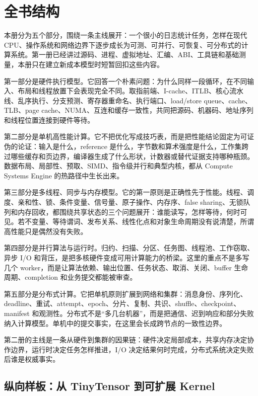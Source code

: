 \chapter*{全书结构}

本册分为五个部分，围绕一条主线展开：一个很小的日志统计任务，怎样在现代 CPU、操作系统和网络边界下逐步成长为可测、可并行、可恢复、可分布式的计算系统。第一册已经讲过源码、进程、虚拟地址、汇编、ABI、工具链和基础测量，本册只在建立新成本模型时短暂回扣这些内容。

第一部分是硬件执行模型。它回答一个朴素问题：为什么同样一段循环，在不同输入、布局和线程放置下会表现完全不同。取指前端、I-cache、ITLB、核心流水线、乱序执行、分支预测、寄存器重命名、执行端口、load/store queue、cache、TLB、page cache、NUMA、互连和缓存一致性，共同把源码、机器码、地址序列和线程位置连接到硬件等待。

第二部分是单机高性能计算。它不把优化写成技巧表，而是把性能结论固定为可证伪的论证：输入是什么，reference 是什么，字节数和算术强度是什么，工作集跨过哪些缓存和页边界，编译器生成了什么形状，计数器或替代证据支持哪种瓶颈。数据布局、局部性、预取、SIMD、指令级并行和典型内核，都从 Compute Systems Engine 的热路径中生长出来。

第三部分是多线程、同步与内存模型。它的第一原则是正确性先于性能。线程、调度、亲和性、锁、条件变量、信号量、原子操作、内存序、false sharing、无锁队列和内存回收，都围绕共享状态的三个问题展开：谁能读写，怎样等待，何时可见。若不变量、等待谓词、发布关系、线性化点和对象生命周期没有说清楚，所谓高性能只是偶然没有失败。

第四部分是并行算法与运行时。归约、扫描、分区、任务图、线程池、工作窃取、异步 I/O 和背压，是把多核硬件变成可用计算能力的桥梁。这里的重点不是多写几个 worker，而是让算法依赖、输出位置、任务状态、取消、关闭、buffer 生命周期、completion 和业务提交都能被审查。

第五部分是分布式计算。它把单机原则扩展到网络和集群：消息身份、序列化、deadline、重试、attempt、epoch、分片、复制、共识、shuffle、checkpoint、manifest 和观测性。分布式不是“多几台机器”，而是把通信、迟到响应和部分失败纳入计算模型。单机中的提交事实，在这里会长成跨节点的一致性边界。

\begin{keyidea}
第二册的主线是一条从硬件到集群的因果链：硬件决定局部成本，共享内存决定协作边界，运行时决定任务怎样推进，I/O 决定结果何时完成，分布式系统决定失败后谁是权威事实。
\end{keyidea}

\section*{纵向样板：从 TinyTensor 到可扩展 Kernel}

